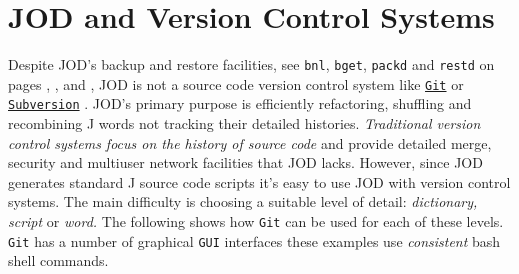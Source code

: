 \section{JOD and Version Control Systems}\label{ap:jodvcsys}

Despite JOD's backup and restore facilities, see \texttt{bnl}, \texttt{bget}, \texttt{packd} and
\texttt{restd} on pages \pageref{ss:bnl}, \pageref{ss:bget}, \pageref{ss:packd} and \pageref{ss:restd}, JOD is not 
a  source code version control system like \href{http://git-scm.com/}{\texttt{Git}} \cite{gitsite} or 
\href{http://subversion.tigris.org/}{\texttt{Subversion}} \cite{subvsite}. 
 JOD's primary
purpose is efficiently  refactoring, shuffling and recombining J words not tracking their detailed histories. 
\emph{Traditional version control systems focus on the history
of source code} and provide detailed  merge, security and multiuser network 
facilities that JOD  lacks.  However, since JOD generates
standard J source code scripts it's easy to use JOD with version control systems. 
The main difficulty is choosing a suitable level of detail: \emph{dictionary, script} or \emph{word.} 
The following shows how \texttt{Git} can be used for each of these levels. \texttt{Git} has
a number of graphical \texttt{GUI} interfaces these examples use
\emph{consistent} bash shell commands.

